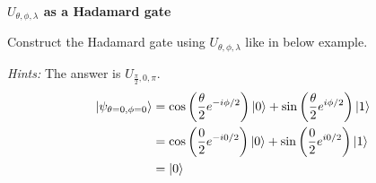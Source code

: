 \documentclass[a4paper, 10pt]{article}
\begin{document}
\begin{problem}
\textbf{\( U_{\theta, \phi, \lambda} \) as a Hadamard gate}
\par Construct the Hadamard gate using \( U_{\theta, \phi, \lambda} \) like in below example.
\par\noindent\textit{Hints:} The answer is \( U_{\frac{\pi}{2}, 0, \pi} \).
\begin{align*}
	\ket{\psi_{\theta=0, \phi=0}} & = \cos\left(\frac{\theta}{2} e^{-i\phi/2}\right) \ket{0} + \sin\left(\frac{\theta}{2} e^{i\phi/2}\right) \ket{1} \\
	                              & = \cos\left(\frac{0}{2} e^{-i0/2}\right) \ket{0} + \sin\left(\frac{0}{2} e^{i0/2}\right) \ket{1}                 \\
	                              & = \ket{0}
\end{align*}
\end{problem}
\end{document}

